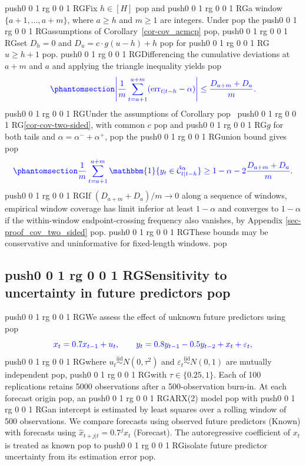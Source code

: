 \documentclass[
  american,
  12pt]{article}
\theoremstyle{plain}
\theoremstyle{plain}
\theoremstyle{remark}
\newcommand{\CPTSadd}[1]{\ifmmode\else\leavevmode\fi\pdfcolorstack 0 push{0 0 1 rg 0 0 1 RG}#1\pdfcolorstack 0 pop}
\begin{document}
\CPTSadd{Fix \(h\in[H]\)} and \CPTSadd{a window \(\{a+1,\ldots,a+m\}\), where \(a\geq h\)
and \(m\geq1\) are integers. Under} the \CPTSadd{assumptions of
Corollary~\ref{cor-cov_acmcp}}, \CPTSadd{set \(D_h=0\) and \(D_u=c\cdot g(u-h)+h\)}
for \CPTSadd{\(u\geq h+1\)}. \CPTSadd{Differencing the cumulative deviations at \(a+m\) and
\(a\) and applying the triangle inequality yields}
\begin{equation}\CPTSadd{\phantomsection\label{eq-window-tail}{
\left|\frac1m\sum_{t=a+1}^{a+m}(\mathrm{err}_{t|t-h}-\alpha)\right|
\leq\frac{D_{a+m}+D_a}{m}.
}}\end{equation} \CPTSadd{Under the assumptions of
Corollary}~\CPTSadd{\ref{cor-cov-two-sided}, with common \(c\)} and \CPTSadd{\(g\) for both
tails and \(\alpha=\alpha^{-}+\alpha^{+}\),} the \CPTSadd{union bound gives}
\begin{equation}\CPTSadd{\phantomsection\label{eq-window-coverage}{
\frac1m\sum_{t=a+1}^{a+m}\mathbbm{1}\{y_t\in\hat{\mathcal C}_{t|t-h}^{\alpha}\}
\geq1-\alpha-2\frac{D_{a+m}+D_a}{m}.
}}\end{equation} \CPTSadd{If \((D_{a+m}+D_a)/m\to0\) along a sequence of windows,
empirical window coverage has limit inferior at least \(1-\alpha\) and
converges to \(1-\alpha\) if the within-window endpoint-crossing
frequency also vanishes, by Appendix \ref{sec-proof_cov_two_sided}}.
\CPTSadd{These bounds may be conservative and uninformative for fixed-length
windows.}

\subsection{\CPTSadd{Sensitivity to uncertainty in future
predictors}}\label{sec-predictor-uncertainty}

\CPTSadd{We assess the effect of unknown future predictors using} \[
\CPTSadd{x_t=0.7x_{t-1}+u_t,\qquad
y_t=0.8y_{t-1}-0.5y_{t-2}+x_t+\varepsilon_t,}
\] \CPTSadd{where \(u_t\overset{\mathrm{iid}}{\sim}N(0,\tau^2)\) and
\(\varepsilon_t\overset{\mathrm{iid}}{\sim}N(0,1)\) are mutually
independent}, \CPTSadd{with \(\tau\in\{0.25,1\}\). Each of 100 replications
retains 5000 observations after a 500-observation burn-in. At each
forecast origin}, an \CPTSadd{ARX(2) model} with \CPTSadd{an intercept is estimated by least
squares over a rolling window of 500 observations. We compare forecasts
using observed future predictors (Known) with forecasts using
\(\hat x_{t+j|t}=0.7^j x_t\) (Forecast). The autoregressive coefficient
of \(x_t\) is treated as known} to \CPTSadd{isolate future predictor uncertainty
from its estimation error}.
\end{document}
